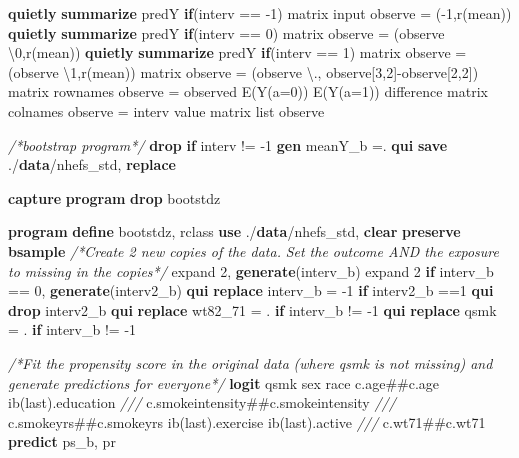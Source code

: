 \documentclass[
  10pt,
]{book}
\newenvironment{Shaded}{\begin{snugshade}}{\end{snugshade}}
\newcommand{\CommentTok}[1]{\textcolor[rgb]{0.56,0.35,0.01}{\textit{#1}}}
\newcommand{\FunctionTok}[1]{\textcolor[rgb]{0.00,0.00,0.00}{#1}}
\newcommand{\KeywordTok}[1]{\textcolor[rgb]{0.13,0.29,0.53}{\textbf{#1}}}
\newcommand{\NormalTok}[1]{#1}
\newcommand{\OtherTok}[1]{\textcolor[rgb]{0.56,0.35,0.01}{#1}}
\begin{document}
\begin{Shaded}
\begin{Highlighting}[]
\KeywordTok{quietly} \KeywordTok{summarize}\NormalTok{ predY }\KeywordTok{if}\NormalTok{(interv == {-}1)}
\FunctionTok{matrix}\NormalTok{ input observe = ({-}1,}\OtherTok{\textasciigrave{}r(mean)\textquotesingle{}}\NormalTok{)}
\KeywordTok{quietly} \KeywordTok{summarize}\NormalTok{ predY }\KeywordTok{if}\NormalTok{(interv == 0)}
\FunctionTok{matrix}\NormalTok{ observe = (observe \textbackslash{}0,}\OtherTok{\textasciigrave{}r(mean)\textquotesingle{}}\NormalTok{)}
\KeywordTok{quietly} \KeywordTok{summarize}\NormalTok{ predY }\KeywordTok{if}\NormalTok{(interv == 1)}
\FunctionTok{matrix}\NormalTok{ observe = (observe \textbackslash{}1,}\OtherTok{\textasciigrave{}r(mean)\textquotesingle{}}\NormalTok{)}
\FunctionTok{matrix}\NormalTok{ observe = (observe \textbackslash{}., observe[3,2]{-}observe[2,2]) }
\FunctionTok{matrix} \OtherTok{rownames}\NormalTok{ observe = observed E(Y(a=0)) E(Y(a=1)) difference}
\FunctionTok{matrix} \OtherTok{colnames}\NormalTok{ observe = interv }\OtherTok{value}
\FunctionTok{matrix} \OtherTok{list}\NormalTok{ observe }

\CommentTok{/*bootstrap program*/}
\KeywordTok{drop} \KeywordTok{if}\NormalTok{ interv != {-}1}
\KeywordTok{gen}\NormalTok{ meanY\_b =.}
\KeywordTok{qui} \KeywordTok{save}\NormalTok{ ./}\KeywordTok{data}\NormalTok{/nhefs\_std, }\KeywordTok{replace}

\KeywordTok{capture} \KeywordTok{program} \KeywordTok{drop}\NormalTok{ bootstdz}

\KeywordTok{program} \KeywordTok{define}\NormalTok{ bootstdz, rclass}
\KeywordTok{use}\NormalTok{ ./}\KeywordTok{data}\NormalTok{/nhefs\_std, }\KeywordTok{clear}
\KeywordTok{preserve}
\KeywordTok{bsample} 
\CommentTok{/*Create 2 new copies of the data. }
\CommentTok{Set the outcome AND the exposure to missing in the copies*/}
\NormalTok{expand 2, }\KeywordTok{generate}\NormalTok{(interv\_b)}
\NormalTok{expand 2 }\KeywordTok{if}\NormalTok{ interv\_b == 0, }\KeywordTok{generate}\NormalTok{(interv2\_b)}
\KeywordTok{qui} \KeywordTok{replace}\NormalTok{ interv\_b = {-}1 }\KeywordTok{if}\NormalTok{ interv2\_b ==1}
\KeywordTok{qui} \KeywordTok{drop}\NormalTok{ interv2\_b}
\KeywordTok{qui} \KeywordTok{replace}\NormalTok{ wt82\_71 = . }\KeywordTok{if}\NormalTok{ interv\_b != {-}1}
\KeywordTok{qui} \KeywordTok{replace}\NormalTok{ qsmk = . }\KeywordTok{if}\NormalTok{ interv\_b != {-}1}

\CommentTok{/*Fit the propensity score in the original data }
\CommentTok{(where qsmk is not missing) and generate predictions for everyone*/}
\KeywordTok{logit}\NormalTok{ qsmk sex race c.age\#\#c.age ib(}\FunctionTok{last}\NormalTok{).education }\CommentTok{///}
\NormalTok{  c.smokeintensity\#\#c.smokeintensity }\CommentTok{///}
\NormalTok{    c.smokeyrs\#\#c.smokeyrs ib(}\FunctionTok{last}\NormalTok{).exercise ib(}\FunctionTok{last}\NormalTok{).active }\CommentTok{///}
\NormalTok{    c.wt71\#\#c.wt71 }
\KeywordTok{predict}\NormalTok{ ps\_b, pr}


\end{Highlighting}
\end{Shaded}
\end{document}
